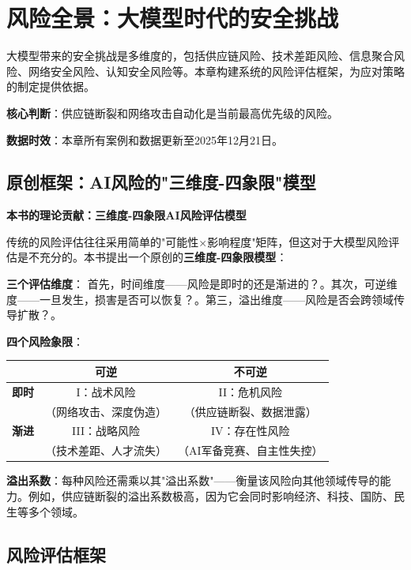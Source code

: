 \chapter{风险全景：大模型时代的安全挑战}

大模型带来的安全挑战是多维度的，包括供应链风险、技术差距风险、信息聚合风险、网络安全风险、认知安全风险等。本章构建系统的风险评估框架，为应对策略的制定提供依据。

\textbf{核心判断}：供应链断裂和网络攻击自动化是当前最高优先级的风险。

\textbf{数据时效}：本章所有案例和数据更新至2025年12月21日。

\section{原创框架：AI风险的"三维度-四象限"模型}

\textbf{本书的理论贡献：三维度-四象限AI风险评估模型}

传统的风险评估往往采用简单的"可能性×影响程度"矩阵，但这对于大模型风险评估是不充分的。本书提出一个原创的\textbf{三维度-四象限模型}：

\textbf{三个评估维度}：
首先，时间维度——风险是即时的还是渐进的？。其次，可逆维度——一旦发生，损害是否可以恢复？。第三，溢出维度——风险是否会跨领域传导扩散？。

\textbf{四个风险象限}：
\begin{center}
\small
\begin{tabular}{|c|c|c|}
\hline
& \textbf{可逆} & \textbf{不可逆} \\
\hline
\textbf{即时} & I：战术风险 & II：危机风险 \\
& （网络攻击、深度伪造） & （供应链断裂、数据泄露） \\
\hline
\textbf{渐进} & III：战略风险 & IV：存在性风险 \\
& （技术差距、人才流失） & （AI军备竞赛、自主性失控） \\
\hline
\end{tabular}
\end{center}

\textbf{溢出系数}：每种风险还需乘以其"溢出系数"——衡量该风险向其他领域传导的能力。例如，供应链断裂的溢出系数极高，因为它会同时影响经济、科技、国防、民生等多个领域。

\section{风险评估框架}


